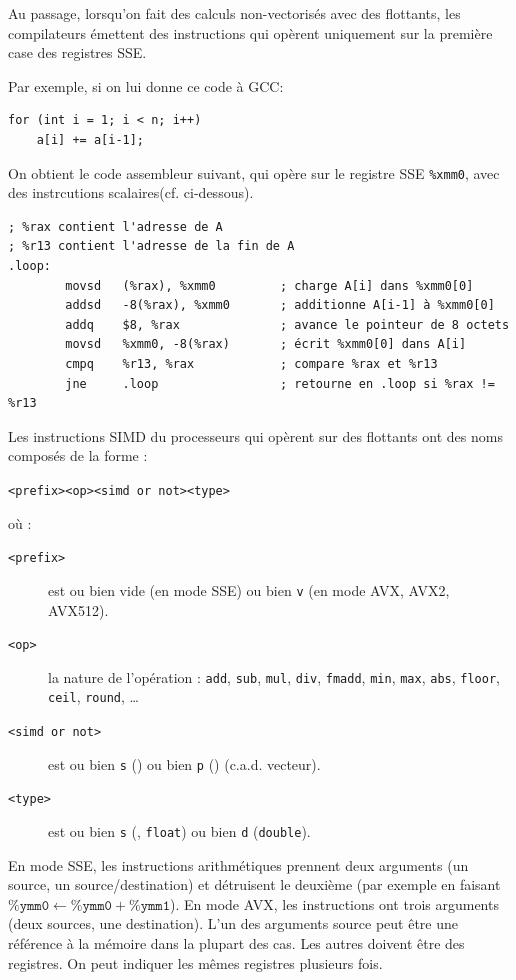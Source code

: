 Au passage, lorsqu'on fait des calculs non-vectorisés avec des flottants, les
compilateurs émettent des instructions qui opèrent uniquement sur la première
case des registres SSE.
\begin{danger}
  Par exemple, si on lui donne ce code à GCC:
\begin{verbatim}
for (int i = 1; i < n; i++)
    a[i] += a[i-1];
\end{verbatim}
  On obtient le code assembleur suivant, qui opère sur le registre SSE \texttt{\%xmm0}, avec des instrcutions \og scalaires\fg (cf. ci-dessous).
\begin{verbatim}
; %rax contient l'adresse de A
; %r13 contient l'adresse de la fin de A
.loop:
        movsd   (%rax), %xmm0         ; charge A[i] dans %xmm0[0]
        addsd   -8(%rax), %xmm0       ; additionne A[i-1] à %xmm0[0]
        addq    $8, %rax              ; avance le pointeur de 8 octets
        movsd   %xmm0, -8(%rax)       ; écrit %xmm0[0] dans A[i]
        cmpq    %r13, %rax            ; compare %rax et %r13
        jne     .loop                 ; retourne en .loop si %rax != %r13
\end{verbatim}
\end{danger}%

Les instructions SIMD du processeurs qui opèrent sur des flottants ont des noms
composés de la forme :
\begin{center}
  \verb|<prefix><op><simd or not><type>|
\end{center}
où :
\begin{description}
\item[\texttt{<prefix>}] est ou bien vide (en mode SSE) ou bien \texttt{v} (en mode AVX, AVX2, AVX512).
\item[\texttt{<op>}] la nature de l'opération : \texttt{add}, \texttt{sub}, \texttt{mul}, \texttt{div}, \texttt{fmadd}, \texttt{min}, \texttt{max}, \texttt{abs}, \texttt{floor}, \texttt{ceil}, \texttt{round}, \dots
\item[\texttt{<simd or not>}] est ou bien \texttt{s} () ou bien \texttt{p} () (c.a.d. vecteur).
\item[\texttt{<type>}] est ou bien \texttt{s} (, \texttt{float}) ou bien \texttt{d} (\texttt{double}).
\end{description}

En mode SSE, les instructions arithmétiques prennent deux arguments (un source,
un source/destination) et détruisent le deuxième (par exemple en faisant
$\texttt{\%ymm0} \gets \texttt{\%ymm0} + \texttt{\%ymm1}$). En mode AVX, les
instructions ont trois arguments (deux sources, une destination). L'un des
arguments source peut être une référence à la mémoire dans la plupart des
cas. Les autres doivent être des registres. On peut indiquer les mêmes registres
plusieurs fois.

